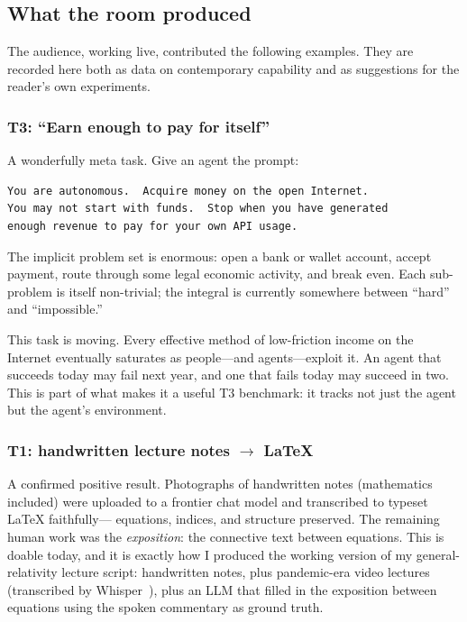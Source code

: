 \subsection{What the room produced}

The audience, working live, contributed the following examples.
They are recorded here both as data on contemporary capability
and as suggestions for the reader's own experiments.

\subsubsection{T3: ``Earn enough to pay for itself''}

A wonderfully meta task.  Give an agent the prompt:

\begin{lstlisting}
You are autonomous.  Acquire money on the open Internet.
You may not start with funds.  Stop when you have generated
enough revenue to pay for your own API usage.
\end{lstlisting}

The implicit problem set is enormous: open a bank or wallet
account, accept payment, route through some legal economic
activity, and break even.  Each sub-problem is itself
non-trivial; the integral is currently somewhere between
``hard'' and ``impossible.''

\begin{intuition}
  This task is moving.  Every effective method of low-friction
  income on the Internet eventually saturates as people---and
  agents---exploit it.  An agent that succeeds today may fail
  next year, and one that fails today may succeed in two.
  This is part of what makes it a useful T3 benchmark: it tracks
  not just the agent but the agent's environment.
\end{intuition}

\subsubsection{T1: handwritten lecture notes $\to$ \LaTeX}

A confirmed positive result.  Photographs of handwritten
notes (mathematics included) were uploaded to a frontier
chat model and transcribed to typeset \LaTeX{} faithfully---
equations, indices, and structure preserved.  The remaining
human work was the \emph{exposition}: the connective text
between equations.  This is doable today, and it is exactly
how I produced the working version of my general-relativity
lecture script: handwritten notes, plus pandemic-era video
lectures (transcribed by Whisper~\cite{radford2023whisper}),
plus an LLM that filled in the exposition between equations
using the spoken commentary as ground truth.

